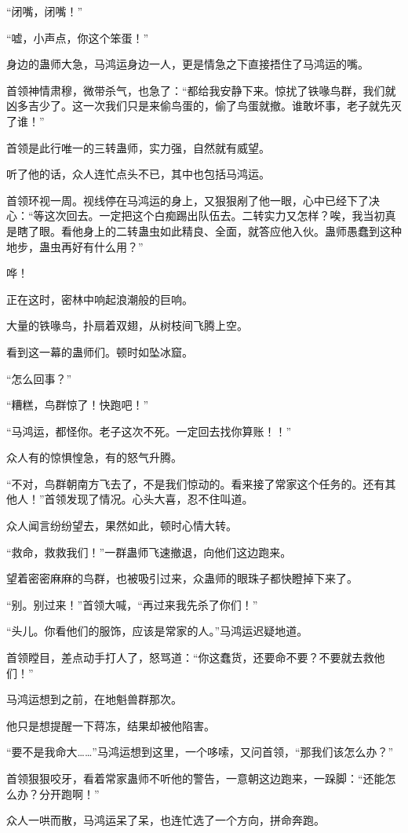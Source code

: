 \begin{this_body}
“闭嘴，闭嘴！”

“嘘，小声点，你这个笨蛋！”

身边的蛊师大急，马鸿运身边一人，更是情急之下直接捂住了马鸿运的嘴。

首领神情肃穆，微带杀气，也急了：“都给我安静下来。惊扰了铁喙鸟群，我们就凶多吉少了。这一次我们只是来偷鸟蛋的，偷了鸟蛋就撤。谁敢坏事，老子就先灭了谁！”

首领是此行唯一的三转蛊师，实力强，自然就有威望。

听了他的话，众人连忙点头不已，其中也包括马鸿运。

首领环视一周。视线停在马鸿运的身上，又狠狠剐了他一眼，心中已经下了决心：“等这次回去。一定把这个白痴踢出队伍去。二转实力又怎样？唉，我当初真是瞎了眼。看他身上的二转蛊虫如此精良、全面，就答应他入伙。蛊师愚蠢到这种地步，蛊虫再好有什么用？”

哗！

正在这时，密林中响起浪潮般的巨响。

大量的铁喙鸟，扑扇着双翅，从树枝间飞腾上空。

看到这一幕的蛊师们。顿时如坠冰窟。

“怎么回事？”

“糟糕，鸟群惊了！快跑吧！”

“马鸿运，都怪你。老子这次不死。一定回去找你算账！！”

众人有的惊惧惶急，有的怒气升腾。

“不对，鸟群朝南方飞去了，不是我们惊动的。看来接了常家这个任务的。还有其他人！”首领发现了情况。心头大喜，忍不住叫道。

众人闻言纷纷望去，果然如此，顿时心情大转。

“救命，救救我们！”一群蛊师飞速撤退，向他们这边跑来。

望着密密麻麻的鸟群，也被吸引过来，众蛊师的眼珠子都快瞪掉下来了。

“别。别过来！”首领大喊，“再过来我先杀了你们！”

“头儿。你看他们的服饰，应该是常家的人。”马鸿运迟疑地道。

首领瞠目，差点动手打人了，怒骂道：“你这蠢货，还要命不要？不要就去救他们！”

马鸿运想到之前，在地魁兽群那次。

他只是想提醒一下蒋冻，结果却被他陷害。

“要不是我命大……”马鸿运想到这里，一个哆嗦，又问首领，“那我们该怎么办？”

首领狠狠咬牙，看着常家蛊师不听他的警告，一意朝这边跑来，一跺脚：“还能怎么办？分开跑啊！”

众人一哄而散，马鸿运呆了呆，也连忙选了一个方向，拼命奔跑。


\end{this_body}
